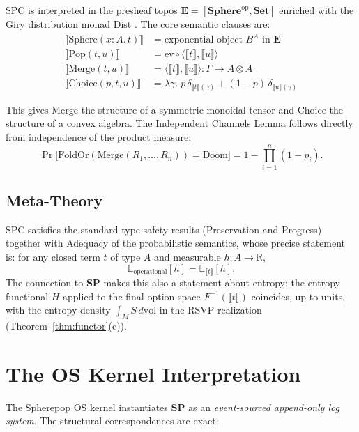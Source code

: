 \documentclass[12pt, a4paper]{article}
\theoremstyle{definition}
\theoremstyle{remark}
\newcommand{\Ent}{H}
\newcommand{\SP}{\mathbf{SP}}
\newcommand{\Pop}{\mathrm{Pop}}
\newcommand{\Sphere}{\mathrm{Sphere}}
\newcommand{\Choice}{\mathrm{Choice}}
\newcommand{\Merge}{\mathrm{Merge}}
\begin{document}
SPC is interpreted in the presheaf topos $\mathbf{E} = [\mathbf{Sphere}^{\mathrm{op}},
\mathbf{Set}]$ enriched with the Giry distribution monad $\mathrm{Dist}$
\citep{giry1982}. The core semantic clauses are:
\begin{align}
  \llbracket \Sphere(x\!:\!A.\,t) \rrbracket &= \text{exponential object } B^A \text{ in } \mathbf{E} \\
  \llbracket \Pop(t, u) \rrbracket &= \mathrm{ev} \circ \langle \llbracket t \rrbracket, \llbracket u \rrbracket \rangle \\
  \llbracket \Merge(t, u) \rrbracket &= \langle \llbracket t \rrbracket, \llbracket u \rrbracket \rangle : \Gamma \to A \otimes A \\
  \llbracket \Choice(p, t, u) \rrbracket &= \lambda\gamma.\; p\,\delta_{\llbracket t \rrbracket(\gamma)} + (1-p)\,\delta_{\llbracket u \rrbracket(\gamma)}
\end{align}

This gives $\Merge$ the structure of a symmetric monoidal tensor and $\Choice$ the
structure of a convex algebra. The Independent Channels Lemma follows directly from independence of the product measure:
\[
  \Pr\!\bigl[\mathrm{FoldOr}(\Merge(R_1,\ldots,R_n)) = \mathrm{Doom}\bigr]
  = 1 - \prod_{i=1}^n (1 - p_i).
\]

\subsection{Meta-Theory}

SPC satisfies the standard type-safety results (Preservation and Progress) together
with Adequacy of the probabilistic semantics, whose precise statement is:
for any closed term $t$ of type $A$ and measurable $h : A \to \mathbb{R}$,
\[
  \mathbb{E}_{\text{operational}}[h] = \mathbb{E}_{\llbracket t \rrbracket}[h].
\]
The connection to $\SP$ makes this also a statement about entropy: the entropy
functional $\Ent$ applied to the final option-space $F^{-1}(\llbracket t \rrbracket)$
coincides, up to units, with the entropy density $\int_M S\,d\mathrm{vol}$ in the RSVP
realization (Theorem~\ref{thm:functor}(c)).

\section{The OS Kernel Interpretation}
\label{sec:kernel}

The Spherepop OS kernel instantiates $\SP$ as an
\emph{event-sourced append-only log system}. The structural correspondences are exact:
\end{document}
